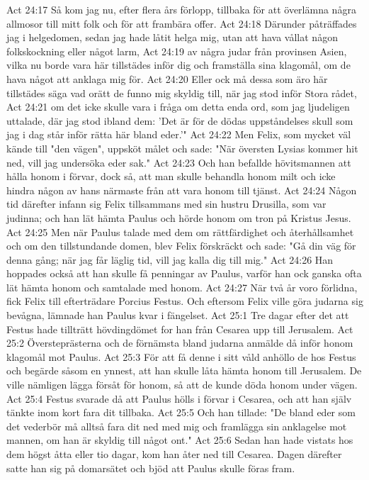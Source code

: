 Act 24:17  Så kom jag nu, efter flera års förlopp, tillbaka för att överlämna några allmosor till mitt folk och för att frambära offer.
Act 24:18  Därunder påträffades jag i helgedomen, sedan jag hade låtit helga mig, utan att hava vållat någon folkskockning eller något larm,
Act 24:19  av några judar från provinsen Asien, vilka nu borde vara här tillstädes inför dig och framställa sina klagomål, om de hava något att anklaga mig för.
Act 24:20  Eller ock må dessa som äro här tillstädes säga vad orätt de funno mig skyldig till, när jag stod inför Stora rådet,
Act 24:21  om det icke skulle vara i fråga om detta enda ord, som jag ljudeligen uttalade, där jag stod ibland dem: 'Det är för de dödas uppståndelses skull som jag i dag står inför rätta här bland eder.'"
Act 24:22  Men Felix, som mycket väl kände till "den vägen", uppsköt målet och sade: "När översten Lysias kommer hit ned, vill jag undersöka eder sak."
Act 24:23  Och han befallde hövitsmannen att hålla honom i förvar, dock så, att man skulle behandla honom milt och icke hindra någon av hans närmaste från att vara honom till tjänst.
Act 24:24  Någon tid därefter infann sig Felix tillsammans med sin hustru Drusilla, som var judinna; och han lät hämta Paulus och hörde honom om tron på Kristus Jesus.
Act 24:25  Men när Paulus talade med dem om rättfärdighet och återhållsamhet och om den tillstundande domen, blev Felix förskräckt och sade: "Gå din väg för denna gång; när jag får läglig tid, vill jag kalla dig till mig."
Act 24:26  Han hoppades också att han skulle få penningar av Paulus, varför han ock ganska ofta lät hämta honom och samtalade med honom.
Act 24:27  När två år voro förlidna, fick Felix till efterträdare Porcius Festus. Och eftersom Felix ville göra judarna sig bevågna, lämnade han Paulus kvar i fängelset.
Act 25:1  Tre dagar efter det att Festus hade tillträtt hövdingdömet for han från Cesarea upp till Jerusalem.
Act 25:2  Översteprästerna och de förnämsta bland judarna anmälde då inför honom klagomål mot Paulus.
Act 25:3  För att få denne i sitt våld anhöllo de hos Festus och begärde såsom en ynnest, att han skulle låta hämta honom till Jerusalem. De ville nämligen lägga försåt för honom, så att de kunde döda honom under vägen.
Act 25:4  Festus svarade då att Paulus hölls i förvar i Cesarea, och att han själv tänkte inom kort fara dit tillbaka.
Act 25:5  Och han tillade: "De bland eder som det vederbör må alltså fara dit ned med mig och framlägga sin anklagelse mot mannen, om han är skyldig till något ont."
Act 25:6  Sedan han hade vistats hos dem högst åtta eller tio dagar, kom han åter ned till Cesarea. Dagen därefter satte han sig på domarsätet och bjöd att Paulus skulle föras fram.
